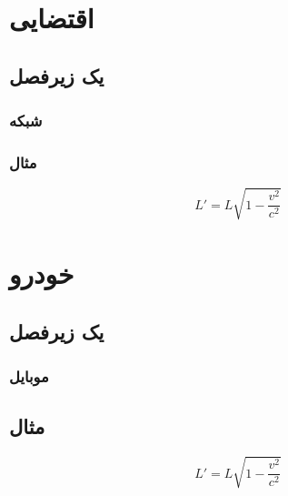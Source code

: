 \documentclass{report}
\numberwithin{equation}{section}
\begin{document}
 
 \chapter{اقتضایی}
 \section{یک زیرفصل}

 \subsection{شبکه}
 
  \subsection{مثال}
  
 \begin{equation}
  L' = {L}{\sqrt{1-\frac{v^2}{c^2}}}
 \end{equation}
 
 
  \chapter{خودرو}
  \section{یک زیرفصل}
 
  \subsection{موبایل}
  
   \section{مثال}
   
  \begin{equation}
   L' = {L}{\sqrt{1-\frac{v^2}{c^2}}}
  \end{equation}
 
\end{document}
